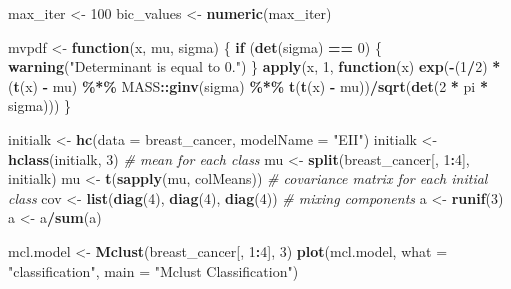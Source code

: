 \documentclass[12pt]{article}
\newenvironment{Shaded}{\begin{snugshade}}{\end{snugshade}}
\newcommand{\AttributeTok}[1]{\textcolor[rgb]{0.13,0.29,0.53}{#1}}
\newcommand{\CommentTok}[1]{\textcolor[rgb]{0.56,0.35,0.01}{\textit{#1}}}
\newcommand{\ControlFlowTok}[1]{\textcolor[rgb]{0.13,0.29,0.53}{\textbf{#1}}}
\newcommand{\DecValTok}[1]{\textcolor[rgb]{0.00,0.00,0.81}{#1}}
\newcommand{\FunctionTok}[1]{\textcolor[rgb]{0.13,0.29,0.53}{\textbf{#1}}}
\newcommand{\NormalTok}[1]{#1}
\newcommand{\OtherTok}[1]{\textcolor[rgb]{0.56,0.35,0.01}{#1}}
\newcommand{\SpecialCharTok}[1]{\textcolor[rgb]{0.81,0.36,0.00}{\textbf{#1}}}
\newcommand{\StringTok}[1]{\textcolor[rgb]{0.31,0.60,0.02}{#1}}
\begin{document}
\begin{Shaded}
\begin{Highlighting}[]
\NormalTok{max\_iter }\OtherTok{\textless{}{-}} \DecValTok{100}
\NormalTok{bic\_values }\OtherTok{\textless{}{-}} \FunctionTok{numeric}\NormalTok{(max\_iter)}

\NormalTok{mvpdf }\OtherTok{\textless{}{-}} \ControlFlowTok{function}\NormalTok{(x, mu, sigma) \{}
    \ControlFlowTok{if}\NormalTok{ (}\FunctionTok{det}\NormalTok{(sigma) }\SpecialCharTok{==} \DecValTok{0}\NormalTok{) \{}
        \FunctionTok{warning}\NormalTok{(}\StringTok{"Determinant is equal to 0."}\NormalTok{)}
\NormalTok{    \}}
    \FunctionTok{apply}\NormalTok{(x, }\DecValTok{1}\NormalTok{, }\ControlFlowTok{function}\NormalTok{(x) }\FunctionTok{exp}\NormalTok{(}\SpecialCharTok{{-}}\NormalTok{(}\DecValTok{1}\SpecialCharTok{/}\DecValTok{2}\NormalTok{) }\SpecialCharTok{*}\NormalTok{ (}\FunctionTok{t}\NormalTok{(x) }\SpecialCharTok{{-}}\NormalTok{ mu) }\SpecialCharTok{\%*\%}\NormalTok{ MASS}\SpecialCharTok{::}\FunctionTok{ginv}\NormalTok{(sigma) }\SpecialCharTok{\%*\%} 
        \FunctionTok{t}\NormalTok{(}\FunctionTok{t}\NormalTok{(x) }\SpecialCharTok{{-}}\NormalTok{ mu))}\SpecialCharTok{/}\FunctionTok{sqrt}\NormalTok{(}\FunctionTok{det}\NormalTok{(}\DecValTok{2} \SpecialCharTok{*}\NormalTok{ pi }\SpecialCharTok{*}\NormalTok{ sigma)))}
\NormalTok{\}}

\NormalTok{initialk }\OtherTok{\textless{}{-}} \FunctionTok{hc}\NormalTok{(}\AttributeTok{data =}\NormalTok{ breast\_cancer, }\AttributeTok{modelName =} \StringTok{"EII"}\NormalTok{)}
\NormalTok{initialk }\OtherTok{\textless{}{-}} \FunctionTok{hclass}\NormalTok{(initialk, }\DecValTok{3}\NormalTok{)}
\CommentTok{\# mean for each class}
\NormalTok{mu }\OtherTok{\textless{}{-}} \FunctionTok{split}\NormalTok{(breast\_cancer[, }\DecValTok{1}\SpecialCharTok{:}\DecValTok{4}\NormalTok{], initialk)}
\NormalTok{mu }\OtherTok{\textless{}{-}} \FunctionTok{t}\NormalTok{(}\FunctionTok{sapply}\NormalTok{(mu, colMeans))}
\CommentTok{\# covariance matrix for each initial class}
\NormalTok{cov }\OtherTok{\textless{}{-}} \FunctionTok{list}\NormalTok{(}\FunctionTok{diag}\NormalTok{(}\DecValTok{4}\NormalTok{), }\FunctionTok{diag}\NormalTok{(}\DecValTok{4}\NormalTok{), }\FunctionTok{diag}\NormalTok{(}\DecValTok{4}\NormalTok{))}
\CommentTok{\# mixing components}
\NormalTok{a }\OtherTok{\textless{}{-}} \FunctionTok{runif}\NormalTok{(}\DecValTok{3}\NormalTok{)}
\NormalTok{a }\OtherTok{\textless{}{-}}\NormalTok{ a}\SpecialCharTok{/}\FunctionTok{sum}\NormalTok{(a)}

\NormalTok{mcl.model }\OtherTok{\textless{}{-}} \FunctionTok{Mclust}\NormalTok{(breast\_cancer[, }\DecValTok{1}\SpecialCharTok{:}\DecValTok{4}\NormalTok{], }\DecValTok{3}\NormalTok{)}
\FunctionTok{plot}\NormalTok{(mcl.model, }\AttributeTok{what =} \StringTok{"classification"}\NormalTok{, }\AttributeTok{main =} \StringTok{"Mclust Classification"}\NormalTok{)}
\end{Highlighting}
\end{Shaded}
\end{document}
